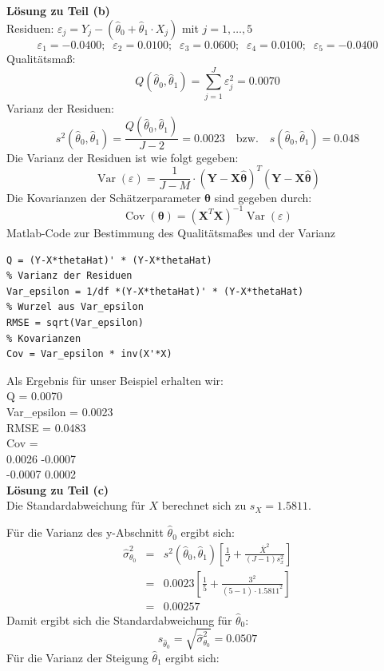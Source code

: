 \textbf{Lösung zu Teil (b)} \\
Residuen: $\varepsilon_j = Y_j -(\hat\theta _0 + \hat\theta _1 \cdot X_j)$
mit $j=1,\ldots ,5$
$$\varepsilon_1 = -0.0400; \;\; \varepsilon_2 =  0.0100;\;\;
\varepsilon_3= 0.0600;\;\; \varepsilon_4 =0.0100;\;\;
\varepsilon_5 = -0.0400
$$
Qualitätsmaß:
$$
Q(\hat\theta _0,\hat\theta _1) = \sum\limits_{j = 1}^J {\varepsilon_j ^2 }
= 0.0070
$$
Varianz der Residuen:
$$
s^2(\hat{\theta}_0 ,\hat{\theta}_1 ) = \frac{Q(\hat{\theta}_0 ,
	\hat{\theta}_1 )}{J - 2} = 0.0023 \quad \text{bzw.} \quad
s(\hat{\theta}_0 ,\hat{\theta}_1 ) = 0.048
$$
Die Varianz der Residuen ist wie folgt gegeben:
\begin{equation}
\operatorname{Var}(\varepsilon) = \frac{1}{J-M} \cdot \left(\mathbf Y - \mathbf X \hat{\boldsymbol\theta}\right)^T
\left(\mathbf Y - \mathbf X \hat{\boldsymbol\theta}\right)
\end{equation}
Die Kovarianzen der Schätzerparameter ${\boldsymbol\theta}$
sind gegeben durch:
\begin{equation}
\operatorname{Cov}(\boldsymbol\theta) = \left(\mathbf{X}^T \mathbf X \right)^{-1}
\operatorname{Var}(\varepsilon)
\end{equation}
Matlab-Code zur Bestimmung des Qualitätsmaßes und der Varianz
\begin{lstlisting}[style=Matlab]
% Qualitaetsmass Q
Q = (Y-X*thetaHat)' * (Y-X*thetaHat)
% Varianz der Residuen
Var_epsilon = 1/df *(Y-X*thetaHat)' * (Y-X*thetaHat)
% Wurzel aus Var_epsilon
RMSE = sqrt(Var_epsilon)
% Kovarianzen
Cov = Var_epsilon * inv(X'*X)
\end{lstlisting}
Als Ergebnis für unser Beispiel erhalten wir:\\
Q = 0.0070 \\
Var\_epsilon = 0.0023\\
RMSE = 0.0483 \\
Cov = \\
0.0026   -0.0007 \\
-0.0007    0.0002 \\

\textbf{Lösung zu Teil (c)} \\
Die Standardabweichung für $X$ berechnet sich zu $s_X = 1.5811$.

Für die Varianz des y-Abschnitt $\hat\theta_0$ ergibt sich:
\begin{eqnarray}
\hat\sigma_{\theta_0}^2 &=& s^2(\hat{\theta}_0 ,\hat{\theta}_1 )
\left[\frac{1}{J} + \frac{\bar{X}^2}{(J-1)s_x^2 } \right]
\nonumber \\
&=&
0.0023
\left[\frac{1}{5} + \frac{3^2}{(5-1)\cdot 1.5811^2 } \right]
\nonumber\\
&=& 0.00257 \nonumber
\end{eqnarray}
Damit ergibt sich die Standardabweichung für $\hat\theta_0$:
$$
s_{\hat\theta_0} = \sqrt{\hat\sigma_{\theta_0}^2} = 0.0507
$$
Für die Varianz der Steigung $\hat\theta_1$ ergibt sich:

